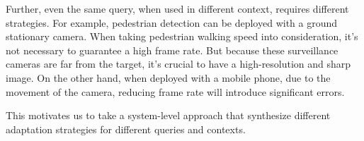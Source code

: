 Further, even the same query, when used in different context, requires different
strategies. For example, pedestrian detection can be deployed with a ground
stationary camera. When taking pedestrian walking speed into consideration, it's
not necessary to guarantee a high frame rate. But because these surveillance
cameras are far from the target, it's crucial to have a high-resolution and
sharp image. On the other hand, when deployed with a mobile phone, due to the
movement of the camera, reducing frame rate will introduce significant
errors.

This motivates us to take a system-level approach that synthesize different
adaptation strategies for different queries and contexts.

